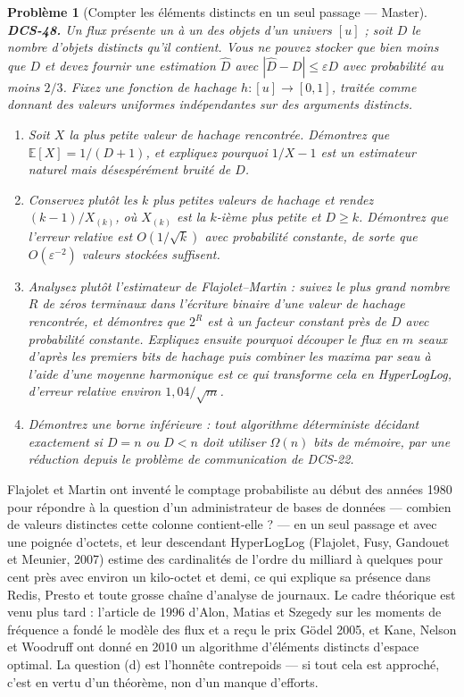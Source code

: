 \documentclass[11pt]{article}
\newtheorem{problem}{Problème}
\begin{document}
\begin{problem}[{Compter les éléments distincts en un seul passage --- Master}]
\textbf{DCS-48.} Un flux présente un à un des objets d'un univers $ [u] $ ; soit $ D $ le nombre d'objets distincts qu'il contient. Vous ne pouvez stocker que bien moins que $ D $ et devez fournir une estimation $ \hat{D} $ avec $ |\hat{D} - D| \le \varepsilon D $ avec probabilité au moins $ 2/3 $. Fixez une fonction de hachage $ h : [u] \to [0,1] $, traitée comme donnant des valeurs uniformes indépendantes sur des arguments distincts.
\begin{enumerate}
\item[(a)] Soit $ X $ la plus petite valeur de hachage rencontrée. Démontrez que $ \mathbb{E}[X] = 1/(D+1) $, et expliquez pourquoi $ 1/X - 1 $ est un estimateur naturel mais désespérément bruité de $ D $.
\item[(b)] Conservez plutôt les $ k $ plus petites valeurs de hachage et rendez $ (k-1)/X_{(k)} $, où $ X_{(k)} $ est la $ k $-ième plus petite et $ D \ge k $. Démontrez que l'erreur relative est $ O(1/\sqrt{k}) $ avec probabilité constante, de sorte que $ O(\varepsilon^{-2}) $ valeurs stockées suffisent.
\item[(c)] Analysez plutôt l'estimateur de Flajolet--Martin : suivez le plus grand nombre $ R $ de zéros terminaux dans l'écriture binaire d'une valeur de hachage rencontrée, et démontrez que $ 2^{R} $ est à un facteur constant près de $ D $ avec probabilité constante. Expliquez ensuite pourquoi découper le flux en $ m $ seaux d'après les premiers bits de hachage puis combiner les maxima par seau à l'aide d'une moyenne harmonique est ce qui transforme cela en HyperLogLog, d'erreur relative environ $ 1{,}04/\sqrt{m} $.
\item[(d)] Démontrez une borne inférieure : tout algorithme déterministe décidant exactement si $ D = n $ ou $ D < n $ doit utiliser $ \Omega(n) $ bits de mémoire, par une réduction depuis le problème de communication de DCS-22.
\end{enumerate}

\end{problem}

\noindent Flajolet et Martin ont inventé le comptage probabiliste au début des années 1980 pour répondre à la question d'un administrateur de bases de données --- combien de valeurs distinctes cette colonne contient-elle ? --- en un seul passage et avec une poignée d'octets, et leur descendant HyperLogLog (Flajolet, Fusy, Gandouet et Meunier, 2007) estime des cardinalités de l'ordre du milliard à quelques pour cent près avec environ un kilo-octet et demi, ce qui explique sa présence dans Redis, Presto et toute grosse chaîne d'analyse de journaux. Le cadre théorique est venu plus tard : l'article de 1996 d'Alon, Matias et Szegedy sur les moments de fréquence a fondé le modèle des flux et a reçu le prix Gödel 2005, et Kane, Nelson et Woodruff ont donné en 2010 un algorithme d'éléments distincts d'espace optimal. La question (d) est l'honnête contrepoids --- si tout cela est approché, c'est en vertu d'un théorème, non d'un manque d'efforts.
\end{document}
